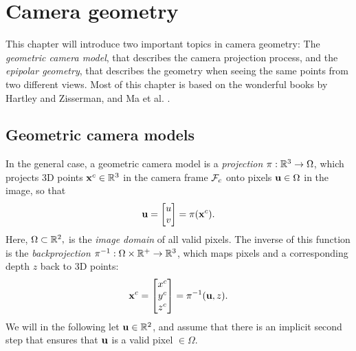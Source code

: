\chapter{Camera geometry}
This chapter will introduce two important topics in camera geometry: The \emph{geometric camera model}, that describes the camera projection process, and the \emph{epipolar geometry}, that describes the geometry when seeing the same points from two different views.
Most of this chapter is based on the wonderful books by Hartley and Zisserman, and Ma et al. \cite{Hartley2004MultipleVision, Ma2004AnVision}.

\section{Geometric camera models}
In the general case, a geometric camera model is a  \emph{projection} $\pi: {\mathbb R}^3 \to \Omega$, which projects 3D points ${\boldsymbol{\mathbf{x}}}^c \in {\mathbb R}^3$ in the camera frame $\mathcal{F}_c$ onto pixels ${\boldsymbol{\mathbf{u}}} \in \Omega$ in the image, so that
\begin{equation}
  {\boldsymbol{\mathbf{u}}} = 
  \begin{bmatrix}
  u\\
  v
  \end{bmatrix}
  = \pi({\boldsymbol{\mathbf{x}}}^c).
\end{equation}
Here, $\Omega \subset {\mathbb R}^2,$ is the \emph{image domain} of all valid pixels.
The inverse of this function is the \emph{backprojection} $\pi^{-1}: \Omega \times {\mathbb R}^+ \to {\mathbb R}^3$, which maps pixels and a corresponding depth $z$ back to 3D points:
\begin{equation}
  {\boldsymbol{\mathbf{x}}}^c =
  \begin{bmatrix}
  x^c\\
  y^c\\
  z^c
  \end{bmatrix}
  = \pi^{-1}({\boldsymbol{\mathbf{u}}}, z).
\end{equation}
We will in the following let ${\boldsymbol{\mathbf{u}}} \in {\mathbb R}^2$, and assume that there is an implicit second step that ensures that ${\boldsymbol{\mathbf{u}}}$ is a valid pixel $\in \Omega$.

